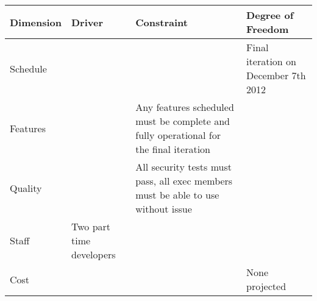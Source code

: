 \documentclass[11pt,letterpaper,rotate]{article}
\begin{document}
\begin{table}
    \begin{tabular}{|l|l|l|l|}
        \hline
        Dimension & Driver                   & Constraint                                                                            & Degree of Freedom                    \\ \hline
        Schedule  & ~                        & ~                                                                                     & Final iteration on December 7th 2012 \\ \hline
        Features  & ~                        & Any features scheduled must be complete and fully operational for the final iteration & ~                                    \\ \hline
        Quality   & ~                        & All security tests must pass, all exec members must be able to use without issue      & ~                                    \\ \hline
        Staff     & Two part time developers & ~                                                                                     & ~                                    \\ \hline
        Cost      & ~                        & ~                                                                                     & None projected                       \\
        \hline
    \end{tabular}
\end{table}
\end{document}
